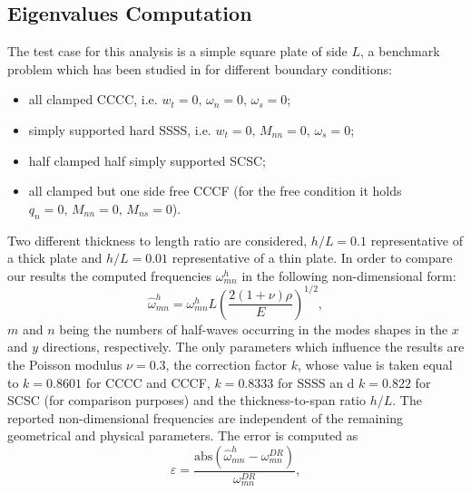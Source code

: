 \documentclass[preprint,12pt]{elsarticle}
\begin{document}
{\subsection{Eigenvalues Computation}
The test case for this analysis is a simple square plate of side $L$, a benchmark problem which has been studied in \cite{dawe1980rayleigh, huang1984nine, duran1999approximation} for different boundary conditions: 
\begin{itemize}
	\item all clamped CCCC, i.e. $w_t = 0, \, \omega_n = 0,  \, \omega_s = 0$; 
	\item simply supported hard SSSS, i.e. $w_t = 0, \, M_{nn} = 0,  \, \omega_s = 0$;
	\item half clamped half simply supported SCSC;
	\item all clamped but one side free CCCF (for the free condition it holds $q_n = 0, \, M_{nn} = 0,  \, M_{ns} = 0$). 
\end{itemize}
Two different thickness to length ratio are considered, $h/L=0.1$ representative of a thick plate and $h/L=0.01$ representative of a thin plate. 
In order to compare our results the computed frequencies $\omega_{mn}^h$ in the following non-dimensional form:
\begin{equation*}
\widehat{\omega}_{mn}^h = \omega_{mn}^h L \left(\frac{2 (1 + \nu) \rho}{E}\right)^{1/2},
\end{equation*}
$m$ and $n$ being the numbers of half-waves occurring in the modes shapes in the $x$ and $y$ directions, respectively. The only parameters which influence the results are the Poisson modulus $\nu=0.3$, the correction factor $k$, whose value is taken equal to $k = 0.8601$ for CCCC and CCCF, $k = 0.8333$ for SSSS an
d $k = 0.822$ for SCSC (for comparison purposes) and the thickness-to-span ratio $h/L$. The reported non-dimensional frequencies are independent of the remaining geometrical and physical parameters.  The error is computed as
\begin{equation*}
\varepsilon = \frac{\text{abs}(\widehat{\omega}_{mn}^h - \omega_{mn}^{DR})}{\omega_{mn}^{DR}},
\end{equation*}
}
\end{document}
